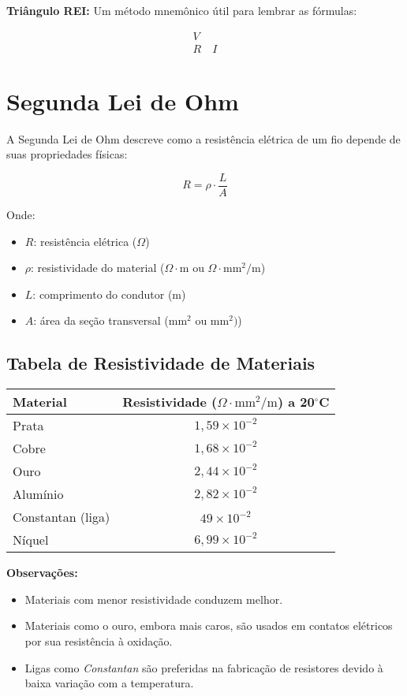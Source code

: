 \textbf{Triângulo REI:} Um método mnemônico útil para lembrar as fórmulas:

\[
\begin{array}{c}
\boxed{V} \\
\boxed{R \quad I}
\end{array}
\]

\section{Segunda Lei de Ohm}

A Segunda Lei de Ohm descreve como a resistência elétrica de um fio depende de suas propriedades físicas:

\[
R = \rho \cdot \frac{L}{A}
\]

Onde:

\begin{itemize}
    \item $R$: resistência elétrica (\(\Omega\))
    \item $\rho$: resistividade do material (\(\Omega \cdot \text{m}\) ou \(\Omega \cdot \text{mm}^2/\text{m}\))
    \item $L$: comprimento do condutor (m)
    \item $A$: área da seção transversal (\(\text{mm}^2\) ou \(\text{mm}^2)\))
\end{itemize}

\subsection{Tabela de Resistividade de Materiais}

\begin{center}
\begin{tabular}{|l|c|}
\hline
\textbf{Material} & \textbf{Resistividade (\(\Omega \cdot \text{mm}^2/\text{m}\)) a 20$^{\circ}$C} \\
\hline
Prata & \(1,59 \times 10^{-2}\) \\
Cobre & \(1,68 \times 10^{-2}\) \\
Ouro & \(2,44 \times 10^{-2}\) \\
Alumínio & \(2,82 \times 10^{-2}\) \\
Constantan (liga) & \(49 \times 10^{-2}\) \\
Níquel & \(6,99 \times 10^{-2}\) \\
\hline
\end{tabular}
\end{center}

\textbf{Observações:}
\begin{itemize}
    \item Materiais com menor resistividade conduzem melhor.
    \item Materiais como o ouro, embora mais caros, são usados em contatos elétricos por sua resistência à oxidação.
    \item Ligas como \textit{Constantan} são preferidas na fabricação de resistores devido à baixa variação com a temperatura.
\end{itemize}

